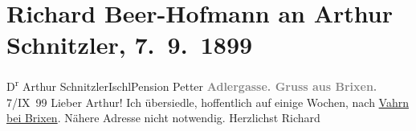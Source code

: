 

         
         \renewcommand{\erwaehntePersonen}{Personen: Richard Beer-Hofmann}
         \renewcommand{\erwaehnteOrte}{Orte: Adlerbrückengasse, Bad Ischl, Brixen, Hotel und Pension Rudolfshöhe (Leopold Petter), Vahrn}
         \renewcommand{\erwaehnteWerke}{}
               \section[Richard Beer-Hofmann an Arthur Schnitzler, 7. 9. 1899]{ Richard Beer-Hofmann an Arthur Schnitzler, 7. 9. 1899}\nopagebreak{}\rehead{ }\begin{ledgroupsized}[t]{13cm}\normalsize\beginnumbering \toendnotes[C]{\smallbreak\pagebreak[2]} 
\pstart{}{\pb}D\textsuperscript{r}
                  Arthur Schnitzler\pend{}\pstart{}Ischl\pend{}\pstart{}Pension Petter\pend{}{\bigskip}\pstart
           \noindent{}\centering{}\textcolor{gray}{\textbf{{\pb}Adlergasse. Gruss aus Brixen.}}\pend
           \pstart
           \raggedleft{}7/IX 99\pend
           \pstart
           Lieber Arthur! Ich übersiedle, hoffentlich auf einige Wochen, nach
                  \uline{Vahrn bei Brixen}. Nähere Adresse nicht notwendig. Herzlichst \spacefill\mbox{Richard}\pend
           
         
         \endnumbering{}\end{ledgroupsized}  \newcommand{\dateiname}{L00968}\newcommand{\titel}{Richard Beer-Hofmann an Arthur Schnitzler, 7. 9. 1899}\newcommand{\editorInnen}{Martin Anton Müller und Gerd-Hermann Susen}
      